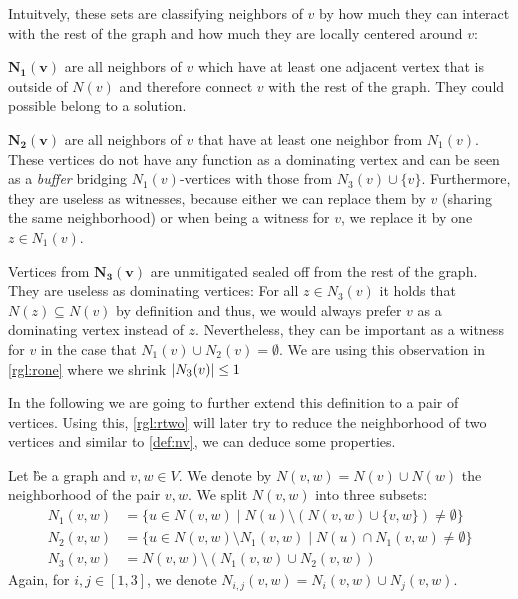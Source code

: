 Intuitvely, these sets are classifying neighbors of $v$ by how much they can interact with the rest of the graph and how much they are locally centered around $v$:

\noindent \textbf{$\mathbf{N_1(v)}$} are all neighbors of $v$ which have at least one adjacent vertex that is outside of $N(v)$ and therefore connect $v$ with the rest of the graph. They could possible belong to a solution.

\noindent \textbf{$\mathbf{N_2(v)}$} are all neighbors of $v$ that have at least one neighbor from $N_1(v)$. These vertices do not have any function as a dominating vertex and can be seen as a \textit{buffer} bridging $N_1(v)$-vertices with those from $N_3(v) \cup \{ v \}$. Furthermore, they are useless as witnesses, because either we can replace them by $v$ (sharing the same neighborhood) or when being a witness for $v$, we replace it by one $z \in N_1(v)$.

\noindent Vertices from $\mathbf{N_3(v)}$ are unmitigated sealed off from the rest of the graph. They are useless as dominating vertices: For all $z \in N_3(v)$ it holds that  $N(z) \subseteq N(v)$ by definition and thus, we would always prefer $v$ as a dominating vertex instead of $z$. Nevertheless, they can be important as a witness for $v$ in the case that $N_1(v) \cup N_2(v) =\emptyset $. We are using this observation in \cref{rgl:rone} where we shrink $\abs{N_3(v)} \leq 1$ 

In the following we are going to further extend this definition to a pair of vertices. Using this, \cref{rgl:rtwo} will later try to reduce the neighborhood of two vertices and similar to \ref{def:nv}, we can deduce some properties.

\begin{definition}
    Let \G be a graph and $v,w \in V$. We denote by $N(v,w) = N(v) \cup N(w)$ the neighborhood of the pair $v,w$. We split $N(v,w)$ into three subsets:
    \begin{align}
    N_1(v,w) &= \{u \in N(v,w) \mid N(u) \setminus (N(v,w)\cup \{v,w\}) \neq \emptyset \} \\
    N_2(v,w) &= \{u \in N(v,w)\setminus N_1(v,w) \mid N(u) \cap N_1(v,w) \neq \emptyset \}\\
    N_3(v,w) &=  N(v,w) \setminus (N_1(v,w) \cup N_2(v,w))
    \end{align}
    Again, for $i,j \in [1,3]$, we denote $N_{i,j}(v,w) = N_i(v,w) \cup N_j(v,w)$.
\end{definition}

